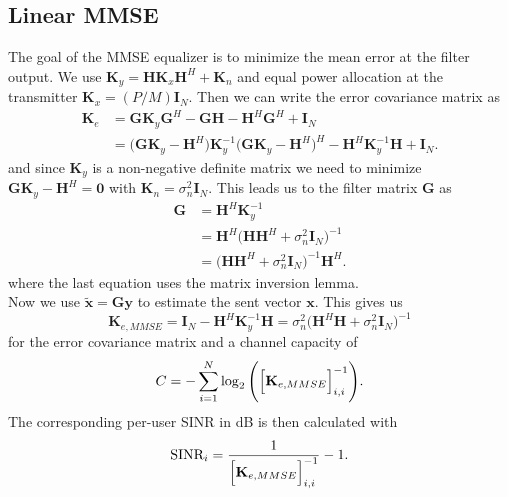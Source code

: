 \subsection{Linear MMSE}
The goal of the MMSE equalizer is to minimize the mean error at the filter output. We use $\mathbf{K}_y = \mathbf{HK}_x\mathbf{H}^H + \mathbf{K}_n$ and equal power allocation at the transmitter $\mathbf{K}_x = (P/M)\mathbf{I}_N$. Then we can write the error covariance matrix as
\begin{align}
	\mathbf{K}_e &= \mathbf{GK}_y\mathbf{G}^H - \mathbf{GH} - \mathbf{H}^H\mathbf{G}^H + \mathbf{I}_N\\
	&=\Biggr(\mathbf{GK}_y - \mathbf{H}^H\Biggl) \mathbf{K}_y^{-1} \Biggr(\mathbf{GK}_y - \mathbf{H}^H\Biggl)^H - \mathbf{H}^H\mathbf{K}_y^{-1}\mathbf{H}+\mathbf{I}_N.
\end{align}
and since $\mathbf{K}_y$ is a non-negative definite matrix we need to minimize $\mathbf{GK}_y-\mathbf{H}^H\bigl=\mathbf{0}$ with $\mathbf{K}_n = \sigma_n^2\mathbf{I}_N$. This leads us to the filter matrix $\mathbf{G}$ as
\begin{align}
	\mathbf{G} &= \mathbf{H}^H\mathbf{K}_y^{-1}\\
	&= \mathbf{H}^H\Biggr(\mathbf{HH}^H + \sigma_n^2\mathbf{I}_N\Biggl)^{-1}\\
	&=\Biggr(\mathbf{HH}^H + \sigma_n^2\mathbf{I}_N\Biggl)^{-1}\mathbf{H}^H.
\end{align}
where the last equation uses the matrix inversion lemma.\\
Now we use $\mathbf{\tilde{x}} = \mathbf{Gy}$ to estimate the sent vector $\mathbf{x}$. This gives us
\begin{equation}
	\mathbf{K}_{e,MMSE} = \mathbf{I}_N - \mathbf{H}^H\mathbf{K}_y^{-1}\mathbf{H} = \sigma_n^2\Biggr(\mathbf{H}^H\mathbf{H} + \sigma_n^2\mathbf{I}_N\Biggl)^{-1}
\end{equation}
for the error covariance matrix and a channel capacity of
\begin{equation}
	C = -\sum_{i=1}^{N}{\log_2{\Biggr(\Bigr[\mathbf{K}_{e,MMSE}\Bigl]_{i,i}^{-1}\Biggl)}}.
\end{equation}
The corresponding per-user SINR in dB is then calculated with
\begin{equation}
	\text{SINR}_{i} = \frac{1}{\Bigr[\mathbf{K}_{e,MMSE}\Bigl]_{i,i}^{-1}} - 1.
\end{equation}

